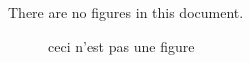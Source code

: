 \documentclass{article}
\begin{document}
There are no figures in this document.

\begin{figure}
\caption{ceci n'est pas une figure}\label{fig:magritte}
\end{figure}
\end{document}
